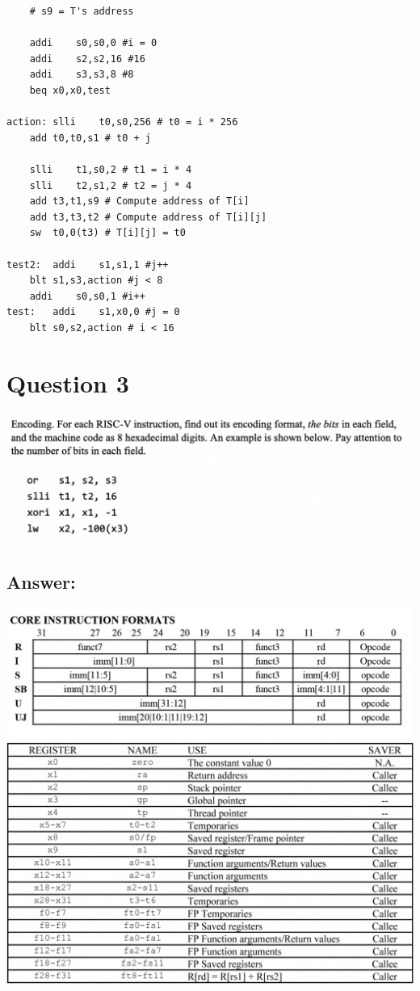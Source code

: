 \documentclass{article}
\begin{document}
\begin{lstlisting}
	# s9 = T's address

	addi	s0,s0,0 #i = 0
	addi	s2,s2,16 #16
	addi	s3,s3,8 #8
	beq	x0,x0,test

action: slli	t0,s0,256 # t0 = i * 256
	add	t0,t0,s1 # t0 + j
	
	slli	t1,s0,2 # t1 = i * 4
	slli	t2,s1,2 # t2 = j * 4
	add	t3,t1,s9 # Compute address of T[i]
	add	t3,t3,t2 # Compute address of T[i][j]
	sw	t0,0(t3) # T[i][j] = t0
	
test2:	addi	s1,s1,1 #j++
	blt	s1,s3,action #j < 8
	addi	s0,s0,1 #i++
test: 	addi	s1,x0,0 #j = 0
	blt	s0,s2,action # i < 16
\end{lstlisting}

\section*{Question 3}
\begin{center}
    \includegraphics[scale=.559]{./images/Q3Problem.png}
\end{center}

\subsection*{Answer:}
\begin{center}
	\includegraphics[scale=.45]{./images/format.png}
	\includegraphics[scale=.3]{./images/register_list.png}
\end{center}
\end{document}
